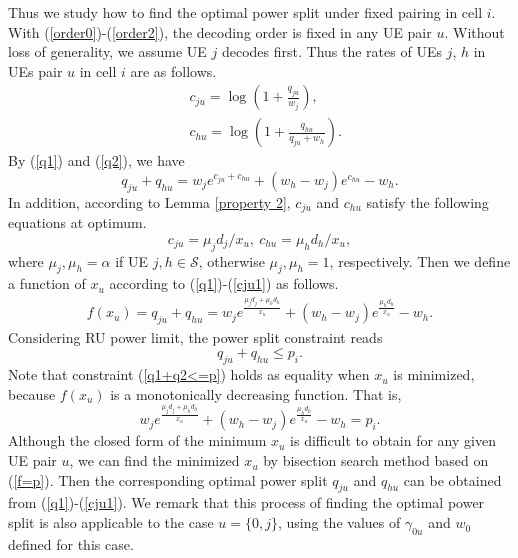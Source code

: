 \documentclass[10pt,journal,final,finalsubmission,twocolumn]{IEEEtran}
\begin{document}
Thus we study how to find the optimal power split under fixed pairing in cell $i$. With (\ref{order0})-(\ref{order2}), the decoding order is fixed in any UE pair $u$. Without loss of generality, we assume UE $j$ decodes first. Thus the rates of UEs $j$, $h$ in UEs pair $u$ in cell $i$ are as follows.
\begin{align}
&c_{ju} = \log(1+\frac{q_{ju}}{w_j}),\label{q1}\\
&c_{hu} = \log(1+\frac{q_{hu}}{q_{ju}+w_h}).\label{q2}
\end{align}
By (\ref{q1}) and (\ref{q2}), we have 
\begin{equation}
q_{ju} + q_{hu} = w_j e^{c_{ju}+c_{hu}}+(w_h-w_j) e^{c_{hu}}-w_h.
\end{equation}
 In addition, according to Lemma \ref{property 2}, $c_{ju}$ and $c_{hu}$ satisfy the following equations at optimum.
\begin{equation}\label{cju1}
c_{ju} = {\mu_j d_j}/{x_u},\ c_{hu} = {\mu_h d_h}/{x_u},
\end{equation}
where $\mu_j,\mu_h = \alpha$ if UE $j, h\in \mathcal{S}$, otherwise $\mu_j,\mu_h = 1$, respectively. Then we define a function of $x_u$ according to (\ref{q1})-(\ref{cju1}) as follows.
 \begin{align}
 f(x_u) \!=\! q_{ju}\!+\!q_{hu}\! = \!w_je^{\frac{\mu_j d_j+\mu_h d_h}{x_u}}\!+\!(w_h\!-\!w_j)e^{\frac{\mu_h d_h}{x_u}}\!-\!w_h.\label{q1+q2}
 \end{align} 
Considering RU power limit, the power split constraint reads
\begin{equation}\label{q1+q2<=p}
q_{ju}+q_{hu} \leq p_i.
\end{equation}
Note that constraint (\ref{q1+q2<=p}) holds as equality when $x_u$ is minimized, because $f(x_u)$ is a monotonically decreasing function. That is,
 \begin{equation}\label{f=p}
w_je^{\frac{\mu_j d_j+\mu_h d_h}{x_u}}+(w_h-w_j)e^{\frac{\mu_h d_h}{x_u}}-w_h= p_i.
 \end{equation}
Although the closed form of the minimum $x_u$ is difficult to obtain for any given UE pair $u$, we can find the minimized $x_u$ by bisection search method based on (\ref{f=p}). Then the corresponding optimal power split $q_{ju}$ and $q_{hu}$ can be obtained from (\ref{q1})-(\ref{cju1}). We remark that this process of finding the optimal power split is also applicable to the case $u=\{0,j\}$, using the values of $\gamma_{0u}$ and $w_0$ defined for this case.
 
\end{document}
